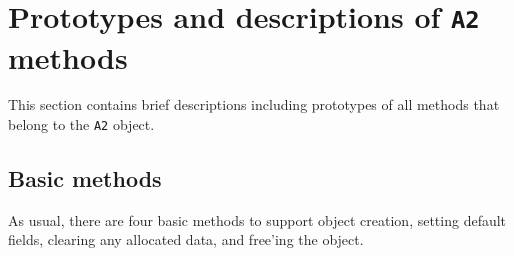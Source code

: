 \par
\section{Prototypes and descriptions of {\tt A2} methods}
\label{section:A2:proto}
\par
This section contains brief descriptions including prototypes
of all methods that belong to the {\tt A2} object.
\par
\subsection{Basic methods}
\label{subsection:A2:proto:basics}
\par
As usual, there are four basic methods to support object creation,
setting default fields, clearing any allocated data, and free'ing
the object.
\par
